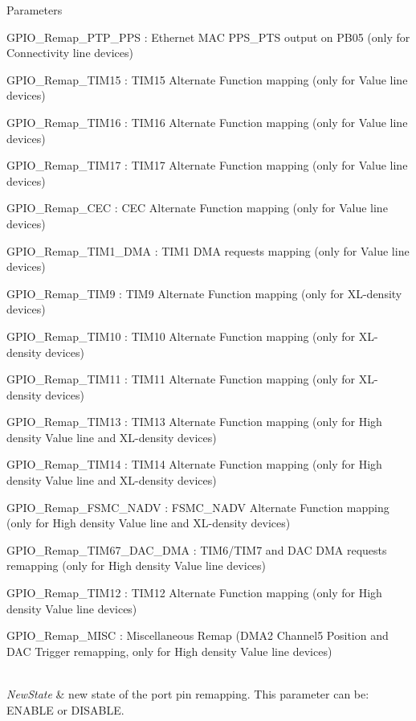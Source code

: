 \begin{DoxyParams}{Parameters}
\begin{DoxyItemize}
\item G\+P\+I\+O\+\_\+\+Remap\+\_\+\+P\+T\+P\+\_\+\+P\+PS \+: Ethernet M\+AC P\+P\+S\+\_\+\+P\+TS output on P\+B05 (only for Connectivity line devices) \item G\+P\+I\+O\+\_\+\+Remap\+\_\+\+T\+I\+M15 \+: T\+I\+M15 Alternate Function mapping (only for Value line devices) \item G\+P\+I\+O\+\_\+\+Remap\+\_\+\+T\+I\+M16 \+: T\+I\+M16 Alternate Function mapping (only for Value line devices) \item G\+P\+I\+O\+\_\+\+Remap\+\_\+\+T\+I\+M17 \+: T\+I\+M17 Alternate Function mapping (only for Value line devices) \item G\+P\+I\+O\+\_\+\+Remap\+\_\+\+C\+EC \+: C\+EC Alternate Function mapping (only for Value line devices) \item G\+P\+I\+O\+\_\+\+Remap\+\_\+\+T\+I\+M1\+\_\+\+D\+MA \+: T\+I\+M1 D\+MA requests mapping (only for Value line devices) \item G\+P\+I\+O\+\_\+\+Remap\+\_\+\+T\+I\+M9 \+: T\+I\+M9 Alternate Function mapping (only for X\+L-\/density devices) \item G\+P\+I\+O\+\_\+\+Remap\+\_\+\+T\+I\+M10 \+: T\+I\+M10 Alternate Function mapping (only for X\+L-\/density devices) \item G\+P\+I\+O\+\_\+\+Remap\+\_\+\+T\+I\+M11 \+: T\+I\+M11 Alternate Function mapping (only for X\+L-\/density devices) \item G\+P\+I\+O\+\_\+\+Remap\+\_\+\+T\+I\+M13 \+: T\+I\+M13 Alternate Function mapping (only for High density Value line and X\+L-\/density devices) \item G\+P\+I\+O\+\_\+\+Remap\+\_\+\+T\+I\+M14 \+: T\+I\+M14 Alternate Function mapping (only for High density Value line and X\+L-\/density devices) \item G\+P\+I\+O\+\_\+\+Remap\+\_\+\+F\+S\+M\+C\+\_\+\+N\+A\+DV \+: F\+S\+M\+C\+\_\+\+N\+A\+DV Alternate Function mapping (only for High density Value line and X\+L-\/density devices) \item G\+P\+I\+O\+\_\+\+Remap\+\_\+\+T\+I\+M67\+\_\+\+D\+A\+C\+\_\+\+D\+MA \+: T\+I\+M6/\+T\+I\+M7 and D\+AC D\+MA requests remapping (only for High density Value line devices) \item G\+P\+I\+O\+\_\+\+Remap\+\_\+\+T\+I\+M12 \+: T\+I\+M12 Alternate Function mapping (only for High density Value line devices) \item G\+P\+I\+O\+\_\+\+Remap\+\_\+\+M\+I\+SC \+: Miscellaneous Remap (D\+M\+A2 Channel5 Position and D\+AC Trigger remapping, only for High density Value line devices)\end{DoxyItemize}
\\
\hline
{\em New\+State} & new state of the port pin remapping. This parameter can be\+: E\+N\+A\+B\+LE or D\+I\+S\+A\+B\+LE. \\
\hline
\end{DoxyParams}


